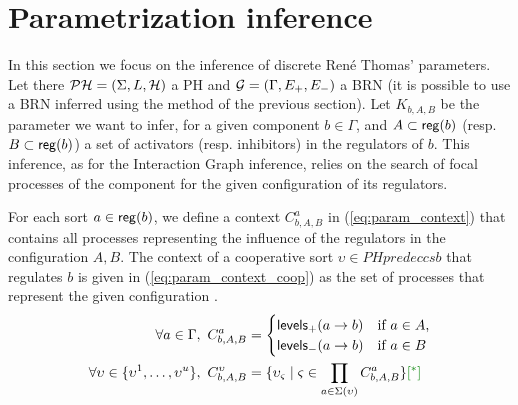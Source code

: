 \section{Parametrization inference}



In this section we focus on the inference of discrete René Thomas' parameters.
Let there $\mathcal{PH} = (\Sigma,L,\mathcal{H})$ a PH and $\mathcal{G} = (\Gamma,E_+,E_-)$ a BRN (it is possible to use a BRN inferred using the method of the previous section).
Let $K_{b,A,B}$ be the parameter we want to infer, for a given component $b \in \Gamma$, and $A \subset \mathsf{reg}({b})$ (resp. $B \subset \mathsf{reg}({b})$) a set of activators (resp. inhibitors) in the regulators of $b$. This inference, as for the Interaction Graph inference, relies on the search of focal processes of the component for the given configuration of its regulators.

For each sort $a \in \mathsf{reg}({b})$, we define a context $C^a_{b,A,B}$ in (\ref{eq:param_context}) that contains all processes representing the influence of the regulators in the configuration $A,B$. The context of a cooperative sort $\upsilon \in PHpredeccs{b}$ that regulates $b$ is given in (\ref{eq:param_context_coop}) as the set of processes that represent the given configuration .
\begin{align}
\label{eq:param_context}
\forall a\in\Gamma,~
C_{b,A,B}^a & = \begin{cases}
\levelsA{a}{b} & \text{if $a \in A$,}\\
\levelsI{a}{b} & \text{if $a \in B$}
\end{cases}
\\
\label{eq:param_context_coop}
\forall \upsilon \in \{\upsilon^1, \dots, \upsilon^u\},~
C_{b,A,B}^\upsilon & = \{
\upsilon_\varsigma \mid \varsigma \in \prod_{a \in \Sigma(\upsilon)}C_{b,A,B}^a \} \todo{^*}
\end{align}


